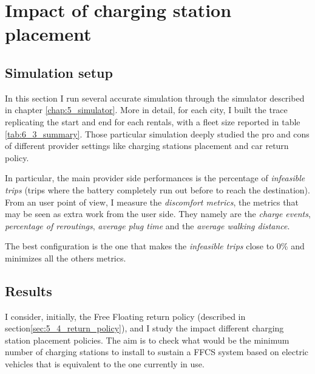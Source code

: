 \section{Impact of charging station placement}
\label{sec:6_6_freefloating}

\subsection{Simulation setup}
In this section I run several accurate simulation through the simulator described in chapter \ref{chap:5_simulator}. More in detail, for each city, I built the trace replicating the start and end for each rentals, with a fleet size reported in table \ref{tab:6_3_summary}. Those particular simulation deeply studied the pro and cons of different provider settings like charging stations placement and car return policy.

In particular, the main provider side performances is the percentage of \textit{infeasible trips} (trips where the battery completely run out before to reach the destination). From an user point of view, I measure the \textit{discomfort metrics}, the metrics that may be seen as extra work from the user side. They namely are the \textit{charge events}, \textit{percentage of reroutings}, \textit{average plug time} and the \textit{average walking distance}. 

The best configuration is the one that makes the \textit{infeasible trips} close to 0\% and minimizes all the others metrics.

\subsection{Results}

I consider, initially,  the Free Floating return policy (described in section\ref{sec:5_4_return_policy}), and I study the impact different charging station placement policies. The aim is to check what would be the minimum number of charging stations to install to sustain a FFCS system based on electric vehicles that is equivalent to the one currently in use.

